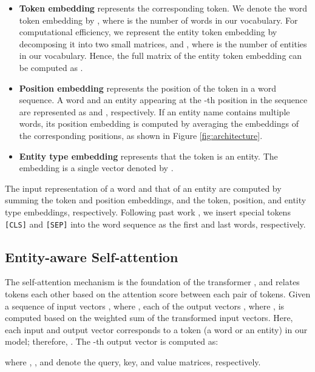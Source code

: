 \documentclass[11pt,a4paper]{article}
\begin{document}
\begin{itemize}[leftmargin=10pt,topsep=3pt,itemsep=3pt]
    \item \textbf{Token embedding} represents the corresponding token.
          We denote the word token embedding by , where  is the number of words in our vocabulary.
          For computational efficiency, we represent the entity token embedding by decomposing it into two small matrices,  and , where  is the number of entities in our vocabulary.
          Hence, the full matrix of the entity token embedding can be computed as .

    \item \textbf{Position embedding} represents the position of the token in a word sequence.
          A word and an entity appearing at the -th position in the sequence are represented as  and , respectively.
          If an entity name contains multiple words, its position embedding is computed by averaging the embeddings of the corresponding positions, as shown in Figure \ref{fig:architecture}.

    \item \textbf{Entity type embedding} represents that the token is an entity.
        The embedding is a single vector denoted by .
\end{itemize}

The input representation of a word and that of an entity are computed by summing the token and position embeddings, and the token, position, and entity type embeddings, respectively.
Following past work \cite{devlin2018bert,Liu2020RoBERTa:Approach}, we insert special tokens \texttt{[CLS]} and \texttt{[SEP]} into the word sequence as the first and last words, respectively.

\subsection{Entity-aware Self-attention}
\label{sec:entity_aware_attn}

The self-attention mechanism is the foundation of the transformer \cite{NIPS2017_7181}, and relates tokens each other based on the attention score between each pair of tokens.
Given a sequence of input vectors , where , each of the output vectors , where , is computed based on the weighted sum of the transformed input vectors.
Here, each input and output vector corresponds to a token (a word or an entity) in our model; therefore, .
The -th output vector  is computed as:

where , , and  denote the query, key, and value matrices, respectively.
\end{document}
